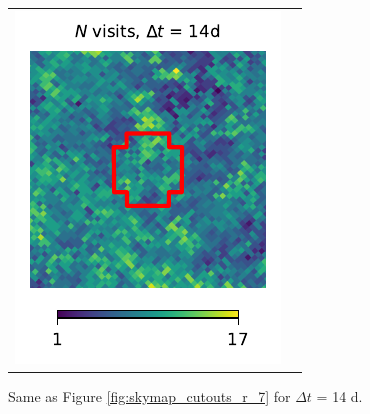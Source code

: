\documentclass[preprintm,linenumbers]{aastex631}
\begin{document}
\begin{figure}
\begin{tabular}{@{}c@{}c@{}}
				\includegraphics{results/skymaps_cutout/skymaps_cutout_first_year_one_snap_v4_0_10yrs_db_noDD_noTwi_tscale-14_nside-256_doAllTemplateMetrics_reduceCount_r_WFD_noDD_noTwi.pdf} \\
			\end{tabular}
			\caption{
				 Same as Figure \ref{fig:skymap_cutouts_r_7} for $\Delta t$ = 14 d.  
			}
   \label{fig:skymap_cutouts_r_14}
		\end{figure}
\end{document}
